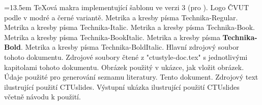 \medskip
\bgroup \leftskip=13.5em
   \TeX{}ová makra implementující šablonu ve verzi 3 (pro \OpTeX).
\bigskip
{}
   Logo ČVUT podle v modré a černé variantě.
\bigskip
{} 
   Metrika a kresby písma {\sbf Technika-Regular}.
   Metrika a kresby písma {\sbi Technika-Italic}.
   Metrika a kresby písma {\ssr Technika-Book}.
   Metrika a kresby písma {\ssi Technika-BookItalic}.
   Metrika a kresby písma {\bf Technika-Bold}.
   Metrika a kresby písma {\bi Technika-BoldItalic}.
\bigskip
{} 
   Hlavní zdrojový soubor tohoto dokumentu.
   Zdrojové soubory čtené z "ctustyle-doc.tex" s jednotlivými kapitolami
   tohoto dokumentu.  
   Obrázek použitý v ukázce, jak vložit obrázek.
   Údaje použité pro generování seznamu literatury.
   Tento dokument.
\bigskip
{}
   Zdrojový text ilustrující použití {\ssr CTUslides}.
   Výstupní ukázka ilustrující použití {\ssr CTUslides} včetně návodu k použití.
\par\egroup

